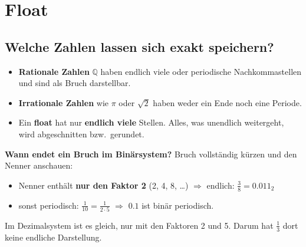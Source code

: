\section{Float}

\subsection*{Welche Zahlen lassen sich exakt speichern?}
\begin{itemize}
  \item \textbf{Rationale Zahlen} $\mathbb{Q}$ haben endlich viele oder periodische
        Nachkommastellen und sind als Bruch darstellbar.
  \item \textbf{Irrationale Zahlen} wie $\pi$ oder $\sqrt2$ haben weder ein Ende noch
        eine Periode.
  \item Ein \textbf{float} hat nur \textbf{endlich viele} Stellen. Alles, was unendlich
        weitergeht, wird abgeschnitten bzw.\ gerundet.
\end{itemize}

\begin{merke}
  \textbf{Wann endet ein Bruch im Binärsystem?} Bruch vollständig kürzen und den
  Nenner anschauen:
  \begin{itemize}[nosep]
    \item Nenner enthält \textbf{nur den Faktor 2} (2, 4, 8, \ldots) $\Rightarrow$ endlich:
          $\tfrac38 = 0.011_2$
    \item sonst periodisch: $\tfrac{1}{10} = \tfrac{1}{2 \cdot 5}$ $\Rightarrow$ $0.1$ ist
          binär periodisch.
  \end{itemize}
  Im Dezimalsystem ist es gleich, nur mit den Faktoren 2 und 5. Darum hat $\tfrac13$
  dort keine endliche Darstellung.
\end{merke}

